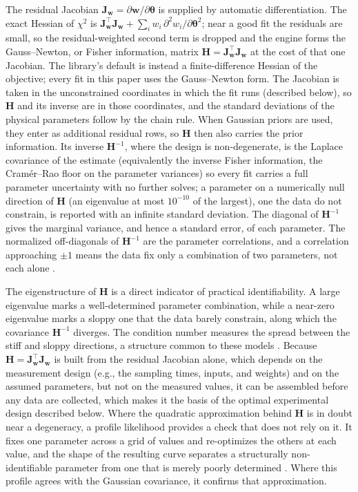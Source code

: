 \documentclass{article}
\begin{document}
The residual Jacobian \(\mathbf{J}_{\mathbf{w}}=\partial\mathbf{w}/\partial\boldsymbol{\theta}\) is supplied by automatic differentiation. The exact Hessian of \(\chi^2\) is \(\mathbf{J}_{\mathbf{w}}^{\top}\mathbf{J}_{\mathbf{w}}+\sum_i w_i\,\partial^2 w_i/\partial\boldsymbol{\theta}^2\); near a good fit the residuals are small, so the residual-weighted second term is dropped and the engine forms the Gauss--Newton, or Fisher information, matrix \(\mathbf{H}=\mathbf{J}_{\mathbf{w}}^{\top}\mathbf{J}_{\mathbf{w}}\) at the cost of that one Jacobian. The library's default is instead a finite-difference Hessian of the objective; every fit in this paper uses the Gauss--Newton form. The Jacobian is taken in the unconstrained coordinates in which the fit runs (described below), so \(\mathbf{H}\) and its inverse are in those coordinates, and the standard deviations of the physical parameters follow by the chain rule. When Gaussian priors are used, they enter as additional residual rows, so \(\mathbf{H}\) then also carries the prior information. Its inverse \(\mathbf{H}^{-1}\), where the design is non-degenerate, is the Laplace covariance of the estimate (equivalently the inverse Fisher information, the Cram\'er--Rao floor on the parameter variances) so every fit carries a full parameter uncertainty with no further solves; a parameter on a numerically null direction of \(\mathbf{H}\) (an eigenvalue at most \(10^{-10}\) of the largest), one the data do not constrain, is reported with an infinite standard deviation. The diagonal of \(\mathbf{H}^{-1}\) gives the marginal variance, and hence a standard error, of each parameter. The normalized off-diagonals of \(\mathbf{H}^{-1}\) are the parameter correlations, and a correlation approaching \(\pm1\) means the data fix only a combination of two parameters, not each alone \citep{brun2001, brun2002}.

The eigenstructure of \(\mathbf{H}\) is a direct indicator of practical identifiability. A large eigenvalue marks a well-determined parameter combination, while a near-zero eigenvalue marks a sloppy one that the data barely constrain, along which the covariance \(\mathbf{H}^{-1}\) diverges. The condition number measures the spread between the stiff and sloppy directions, a structure common to these models \citep{gutenkunst2007}. Because \(\mathbf{H}=\mathbf{J}_{\mathbf{w}}^{\top}\mathbf{J}_{\mathbf{w}}\) is built from the residual Jacobian alone, which depends on the measurement design (e.g., the sampling times, inputs, and weights) and on the assumed parameters, but not on the measured values, it can be assembled before any data are collected, which makes it the basis of the optimal experimental design described below. Where the quadratic approximation behind \(\mathbf{H}\) is in doubt near a degeneracy, a profile likelihood provides a check that does not rely on it. It fixes one parameter across a grid of values and re-optimizes the others at each value, and the shape of the resulting curve separates a structurally non-identifiable parameter from one that is merely poorly determined \citep{raue2009}. Where this profile agrees with the Gaussian covariance, it confirms that approximation.
\end{document}
